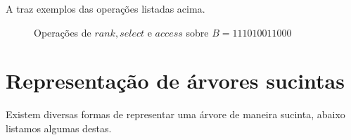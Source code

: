 A  traz exemplos das operações listadas acima.
\begin{figure}[h!]
\centering
  \caption[Operações sobre vetores de bits]{Operações de $rank, select$ e $access$ sobre $B=111010011000$}
  \label{fig:bitvector-operations}
\end{figure}

\section{Representação de árvores sucintas}
Existem diversas formas de representar  uma árvore de maneira sucinta, abaixo listamos algumas destas.


